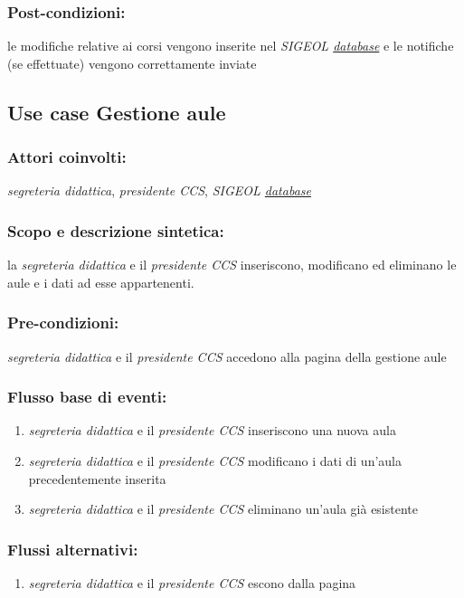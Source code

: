 \documentclass[11pt,a4paper]{article}
\begin{document}
\subsubsection*{Post-condizioni:}
le modifiche relative ai corsi vengono inserite nel \textit{SIGEOL \underline{database}} e le notifiche (se effettuate) vengono correttamente 
inviate

\subsection{Use case Gestione aule}
\subsubsection*{Attori coinvolti:}
\textit{segreteria didattica}, \textit{presidente CCS}, \textit{SIGEOL \underline{database}}
\subsubsection*{Scopo e descrizione sintetica:}
la \textit{segreteria didattica} e il \textit{presidente CCS} inseriscono, modificano ed eliminano le aule e i dati ad esse appartenenti.
\subsubsection*{Pre-condizioni:}
\textit{segreteria didattica} e il \textit{presidente CCS} accedono alla pagina della gestione aule
\subsubsection*{Flusso base di eventi:}
\begin{enumerate}
 \item \textit{segreteria didattica} e il \textit{presidente CCS} inseriscono una nuova aula
 \item \textit{segreteria didattica} e il \textit{presidente CCS} modificano i dati di un'aula precedentemente inserita
 \item \textit{segreteria didattica} e il \textit{presidente CCS} eliminano un'aula già esistente
\end{enumerate}
\subsubsection*{Flussi alternativi:}
\begin{enumerate} 
\item \textit{segreteria didattica} e il \textit{presidente CCS} escono dalla pagina
\end{enumerate}
\end{document}
